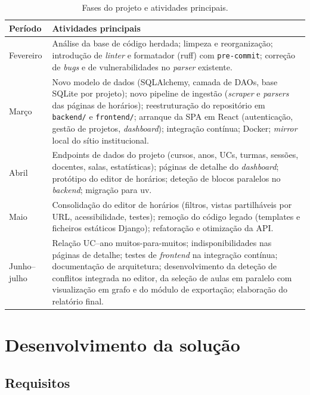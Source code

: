 \documentclass[10pt]{article}
\begin{document}
\begin{table}[h]
\centering
\footnotesize
\begin{tabular}{@{}p{2.2cm} p{11.2cm}@{}}
\hline
\textbf{Período} & \textbf{Atividades principais} \\
\hline
Fevereiro &
Análise da base de código herdada; limpeza e reorganização; introdução de \emph{linter} e formatador (ruff) com \texttt{pre-commit}; correção de \emph{bugs} e de vulnerabilidades no \emph{parser} existente. \\
Março &
Novo modelo de dados (SQLAlchemy, camada de DAOs, base SQLite por projeto); novo pipeline de ingestão (\emph{scraper} e \emph{parsers} das páginas de horários); reestruturação do repositório em \texttt{backend/} e \texttt{frontend/}; arranque da SPA em React (autenticação, gestão de projetos, \emph{dashboard}); integração contínua; Docker; \emph{mirror} local do sítio institucional. \\
Abril &
Endpoints de dados do projeto (cursos, anos, UCs, turmas, sessões, docentes, salas, estatísticas); páginas de detalhe do \emph{dashboard}; protótipo do editor de horários; deteção de blocos paralelos no \emph{backend}; migração para uv. \\
Maio &
Consolidação do editor de horários (filtros, vistas partilháveis por URL, acessibilidade, testes); remoção do código legado (templates e ficheiros estáticos Django); refatoração e otimização da API. \\
Junho--julho &
Relação UC--ano muitos-para-muitos; indisponibilidades nas páginas de detalhe; testes de \emph{frontend} na integração contínua; documentação de arquitetura; desenvolvimento da deteção de conflitos integrada no editor, da seleção de aulas em paralelo com visualização em grafo e do módulo de exportação; elaboração do relatório final. \\
\hline
\end{tabular}
\caption{Fases do projeto e atividades principais.}
\label{tab:atividades}
\end{table} 


\section{Desenvolvimento da solução}

\subsection{Requisitos}
\end{document}
